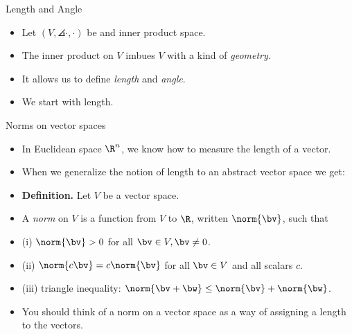 \documentclass{beamer}
\begin{document}

\begin{frame}{Length and Angle}

\begin{itemize}
\item Let $\left(V,\angles{\cdot,\cdot}\right)$ be and inner product space.
\item The inner product on $V$ imbues $V$ with a kind of \emph{geometry.}
\item It allows us to define \emph{length} and \emph{angle}.
\item We start with length.
\end{itemize}
\end{frame}

\begin{frame}{Norms on vector spaces}

\begin{itemize}
\item In Euclidean space $\R^n$, we know how to measure the length of a vector.
\item When we generalize the notion of length to an abstract vector space we get:
\item \textbf{Definition.} Let $V$ be a vector space.
\item A \emph{norm} on $V$ is a function from $V$ to $\R$, written $\norm{\bv}$, such that
\item (i) $\norm{\bv} > 0 $ for all $\bv\in V, \bv\not=0$.
\item (ii) $\norm{c\bv} = c\norm{\bv}$ for all $\bv\in V$ and all scalars $c$.
\item (iii) triangle inequality: $\norm{\bv+\bw} \leq \norm{\bv} + \norm{\bw}$.
\item You should think of a norm on a vector space as a way of assigning a length to the vectors.
\end{itemize}
\end{frame}
\end{document}
